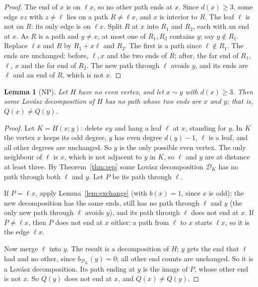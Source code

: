 \documentclass[11pt]{amsart}
\newtheorem{lemma}[theorem]{Lemma}
\theoremstyle{definition}
\newcommand{\cD}{\mathcal D}
\newcommand{\lean}[1]{\quad{\footnotesize[Lean: \texttt{#1}]}}
\begin{document}
\begin{proof}
The end of $x$ is on $\ell x$, so no other path ends at $x$. Since $d(x)\ge3$, some edge $xz$ with
$z\ne\ell$ lies on a path $R\ne\ell x$, and $x$ is interior to $R$. The leaf $\ell$ is not on $R$:
its only edge is on $\ell x$. Split $R$ at $x$ into $R_1$ and $R_2$, each with an end at $x$. As $R$
is a path and $y\ne x$, at most one of $R_1,R_2$ contains $y$; say $y\notin R_1$. Replace $\ell x$
and $R$ by $R_1+x\ell$ and $R_2$. The first is a path since $\ell\notin R_1$. The ends are unchanged:
before, $\ell,x$ and the two ends of $R$; after, the far end of $R_1$, $\ell$, $x$ and the far end of
$R_2$. The new path through $\ell$ avoids $y$, and its ends are $\ell$ and an end of $R$, which is not
$x$.
\end{proof}

\begin{lemma}[NP]\label{lem:np}
Let $H$ have no even vertex, and let $x\sim y$ with $d(x)\ge3$. Then some Lov\'asz decomposition of
$H$ has no path whose two ends are $x$ and $y$; that is, $Q(x)\neq Q(y)$.
\lean{not\_paired\_adj}
\end{lemma}

\begin{proof}
Let $K=H(x;y)$: delete $xy$ and hang a leaf $\ell$ at $x$, standing for $y$. In $K$ the vertex $x$
keeps its odd degree, $y$ has even degree $d(y)-1$, $\ell$ is a leaf, and all other degrees are
unchanged. So $y$ is the only possible even vertex. The only neighbour of $\ell$ is $x$, which is not
adjacent to $y$ in $K$, so $\ell$ and $y$ are at distance at least three. By Theorem~\ref{thm:sep}
some Lov\'asz decomposition $\cD_K$ has no path through both $\ell$ and $y$. Let $P$ be its path
through $\ell$.

If $P=\ell x$, apply Lemma~\ref{lem:exchange} (with $b(x)=1$, since $x$ is odd); the new decomposition
has the same ends, still has no path through $\ell$ and $y$ (the only new path through $\ell$ avoids
$y$), and its path through $\ell$ does not end at $x$. If $P\ne\ell x$, then $P$ does not end at $x$
either: a path from $\ell$ to $x$ starts $\ell x$, so it is the edge $\ell x$.

Now merge $\ell$ into $y$. The result is a decomposition of $H$; $y$ gets the end that $\ell$ had and
no other, since $b_{\cD_K}(y)=0$; all other end counts are unchanged. So it is a Lov\'asz
decomposition. Its path ending at $y$ is the image of $P$, whose other end is not $x$. So $Q(y)$ does
not end at $x$, and $Q(x)\ne Q(y)$.
\end{proof}
\end{document}
